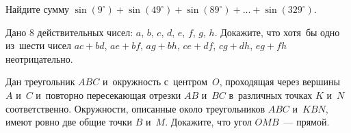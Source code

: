 \begin{problems}
\item
Найдите сумму
\(
    \sin (9^\circ) + \sin (49^\circ) + \sin (89^\circ) +
    \ldots +
    \sin (329^\circ)
\).

\item
Дано 8 действительных чисел: $a$, $b$, $c$, $d$, $e$, $f$, $g$, $h$.
Докажите, что хотя~бы одно из~шести чисел
$a c + b d$, $a e + b f$, $a g + b h$, $c e + d f$, $c g + d h$, $e g + f h$
неотрицательно.

\item
Дан треугольник $ABC$ и~окружность с~центром~$O$, проходящая через вершины
$A$ и~$C$ и~повторно пересекающая отрезки $AB$ и~$BC$ в~различных точках
$K$ и~$N$ соответственно.
Окружности, описанные около треугольников $ABC$ и~$KBN$, имеют ровно две общие
точки $B$ и~$M$.
Докажите, что угол $OMB$~--- прямой.

\end{problems}

